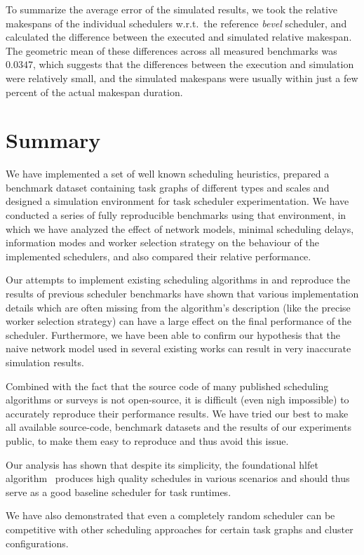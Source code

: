 To summarize the average error of the simulated results, we took the relative makespans of the
individual schedulers w.r.t.\ the reference \emph{bevel} scheduler, and calculated the
difference between the executed and simulated relative makespan. The geometric mean of these
differences across all measured benchmarks was $0.0347$, which suggests that the
differences between the execution and simulation were relatively small, and the simulated makespans
were usually within just a few percent of the actual makespan duration.

\section{Summary}
We have implemented a set of well known scheduling heuristics, prepared a benchmark dataset
containing task graphs of different types and scales and designed a simulation environment for task
scheduler experimentation. We have conducted a series of fully reproducible benchmarks using that
environment, in which we have analyzed the effect of network models, minimal scheduling delays,
information modes and worker selection strategy on the behaviour of the implemented schedulers, and
also compared their relative performance.

Our attempts to implement existing scheduling algorithms in \estee{} and reproduce
the results of previous scheduler benchmarks have shown that various implementation details which
are often missing from the algorithm's description (like the precise worker selection strategy) can
have a large effect on the final performance of the scheduler. Furthermore, we have been able to
confirm our hypothesis that the naive network model used in several existing works can result in
very inaccurate simulation results.

Combined with the fact that the source code of many published scheduling algorithms or surveys is
not open-source, it is difficult (even nigh impossible) to accurately reproduce their performance
results. We have tried our best to make all available source-code, benchmark datasets and the
results of our experiments public, to make them easy to reproduce and thus avoid this issue.

Our analysis has shown that despite its simplicity, the foundational \gls{hlfet}
algorithm~\cite{hlfet1974} produces high quality schedules in various scenarios and should
thus serve as a good baseline scheduler for task runtimes.

We have also demonstrated that even a completely random scheduler can be competitive with other
scheduling approaches for certain task graphs and cluster configurations.

